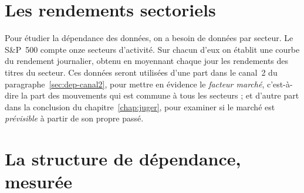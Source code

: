 \section{Les rendements sectoriels}
\label{sec:donnees-secteurs}


Pour étudier la dépendance des données, on a besoin de données
par secteur.
Le S\&P~500 compte onze secteurs d'activité. Sur chacun d'eux on établit
une courbe du rendement journalier, obtenu en moyennant chaque jour les
rendements des titres du secteur.
Ces données seront utilisées d'une part dans le canal~2 du
paragraphe~\ref{sec:dep-canal2}, pour mettre en évidence le \emph{facteur
marché}, c'est-à-dire la part des mouvements qui est commune à tous les
secteurs ; et d'autre part dans la conclusion du chapitre~\ref{chap:juger},
pour examiner si le marché est \emph{prévisible} à partir de son propre passé.



\section{La structure de dépendance, mesurée}
\label{sec:dep-mesuree}


